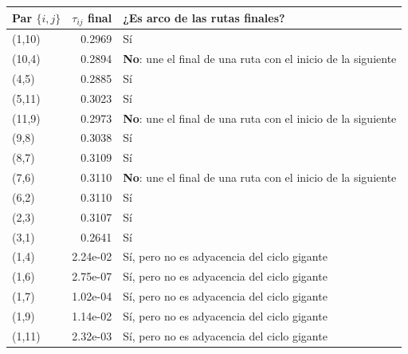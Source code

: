 \begin{tabular}{lrl}\toprule
Par $\{i,j\}$ & $\tau_{ij}$ final & ¿Es arco de las rutas finales?\\\midrule
(1,10) & 0.2969 & Sí\\
(10,4) & 0.2894 & \textbf{No}: une el final de una ruta con el inicio de la siguiente\\
(4,5) & 0.2885 & Sí\\
(5,11) & 0.3023 & Sí\\
(11,9) & 0.2973 & \textbf{No}: une el final de una ruta con el inicio de la siguiente\\
(9,8) & 0.3038 & Sí\\
(8,7) & 0.3109 & Sí\\
(7,6) & 0.3110 & \textbf{No}: une el final de una ruta con el inicio de la siguiente\\
(6,2) & 0.3110 & Sí\\
(2,3) & 0.3107 & Sí\\
(3,1) & 0.2641 & Sí\\\midrule
(1,4) & 2.24e-02 & Sí, pero no es adyacencia del ciclo gigante\\
(1,6) & 2.75e-07 & Sí, pero no es adyacencia del ciclo gigante\\
(1,7) & 1.02e-04 & Sí, pero no es adyacencia del ciclo gigante\\
(1,9) & 1.14e-02 & Sí, pero no es adyacencia del ciclo gigante\\
(1,11) & 2.32e-03 & Sí, pero no es adyacencia del ciclo gigante\\
\bottomrule\end{tabular}
